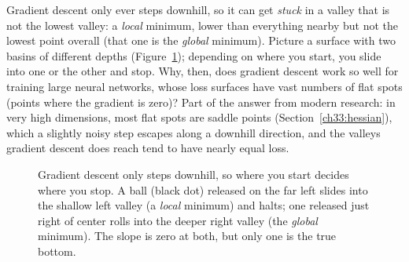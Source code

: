 \begin{walkbox}
Gradient descent only ever steps downhill, so it can get \emph{stuck} in a valley
that is not the lowest valley: a \emph{local} minimum, lower than everything
nearby but not the lowest point overall (that one is the \emph{global} minimum). Picture a surface with
two basins of different depths (Figure~\ref{ch33:fig-localmin}); depending on where
you start, you slide into one or the other and stop. Why, then, does gradient descent work so well for
training large neural networks, whose loss surfaces have vast numbers of flat
spots (points where the gradient is zero)? Part of the answer from modern research:
in very high dimensions, most flat spots are saddle points
(Section~\ref{ch33:hessian}), which a slightly noisy step escapes along a downhill
direction, and the valleys gradient descent does reach tend to have nearly equal
loss.
\end{walkbox}

\begin{figure}[H]
\centering
{}
\caption{Gradient descent only steps downhill, so where you start decides where you
stop. A ball (black dot) released on the far left slides into the shallow left valley (a
\emph{local} minimum) and halts; one released just right of center rolls into the
deeper right valley (the \emph{global} minimum). The slope is zero at both, but
only one is the true bottom.}
\label{ch33:fig-localmin}
\end{figure}

